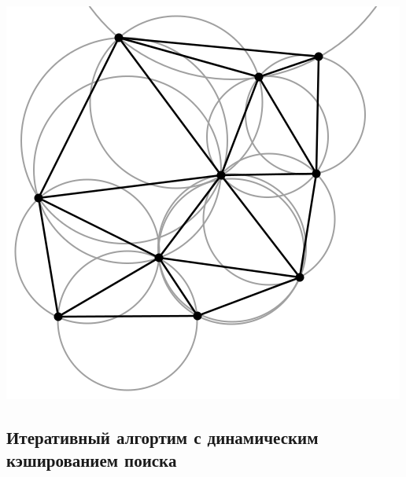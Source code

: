 \documentclass[a4paper, 12pt]{article}   	%
\begin{document}
    \begin{center}
        \begin{minipage}{0.5\linewidth}
            \includegraphics[width=\linewidth]{img/triangulation_delone}
        \end{minipage}
    \end{center}
    
\subsection{Итеративный алгортим с динамическим кэшированием поиска}
\end{document}
